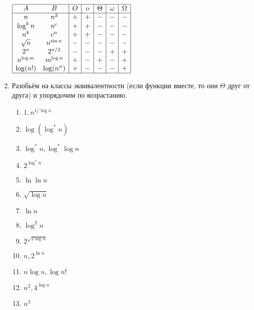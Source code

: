\documentclass[12pt]{article} %
\begin{document}
\begin{enumerate}
 $\begin{array}{|cc|c|c|c|c|c|}
    \hline
    A & B & O & o & \Theta & \omega & \Omega \\
    \hline
    n & n^2 & + & + & - & - & - \\
    \log^k n & n^{\epsilon} & + & + & - & - & - \\
    n^k & c^n & + & + & - & - & - \\
    \sqrt{n} & n^{\sin n} & - & - & - & - & - \\
    2^n & 2^{n \slash 2} & - & - & - & + & + \\
    n^{\log m} & m^{\log n} & + & - & + & - & + \\
    \log (n!) & \log(n^n) & + & - & - & - & + \\
    \hline
  \end{array}$
  \item Разобьём на классы эквивалентности (если функции вместе, то они $\Theta$ друг от друга) и упорядочим по возрастанию.\\
	\begin{enumerate}
	  \setlength{\parskip}{0pt} %
	  \setlength{\itemsep}{0pt} %
	  \item $1, n^{1/\log n}$ \\
	  \item $\log (\log^* n)$ \\
	  \item $\log^* n, \log^* \log n$ \\
	  \item $2^{\log^* n}$ \\
	  \item $\ln \ln n$ \\
	  \item $\sqrt{\log n}$ \\
	  \item $\ln n$ \\
	  \item $\log^2 n$ \\
	  \item $2^{\sqrt{2 \log n}}$ \\
	  \item $n, 2^{\ln n}$ \\
	  \item $n \log n, \log n!$ \\
	  \item $n^2, 4^{\log n}$ \\
	  \item $n^3$ \\

\end{enumerate}
\end{enumerate}
\end{document}

